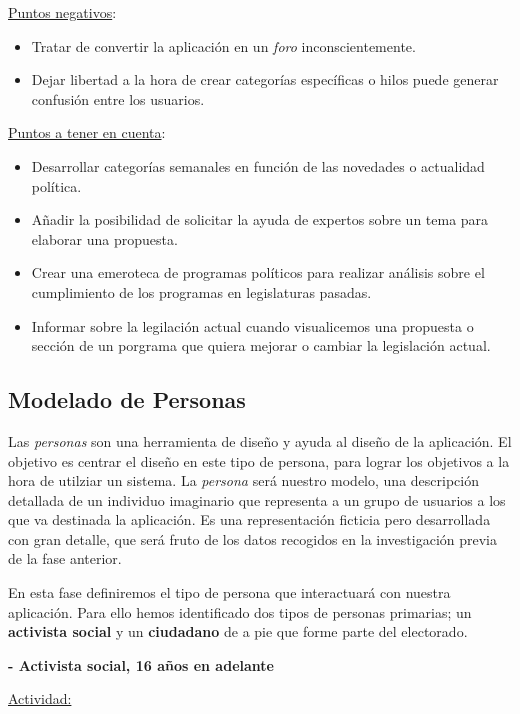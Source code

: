 \underline{Puntos negativos}:

\begin{itemize}
  \item Tratar de convertir la aplicación en un \textit{foro} inconscientemente.
  \item Dejar libertad a la hora de crear categorías específicas o hilos puede generar confusión entre los usuarios. 
\end{itemize}

\underline{Puntos a tener en cuenta}:

\begin{itemize}
  \item Desarrollar categorías semanales en función de las novedades o actualidad política.
  \item Añadir la posibilidad de solicitar la ayuda de expertos sobre un tema para elaborar una propuesta.
  \item Crear una emeroteca de programas políticos para realizar análisis sobre el cumplimiento de los programas en legislaturas pasadas.
  \item Informar sobre la legilación actual cuando visualicemos una propuesta o sección de un porgrama que quiera mejorar o cambiar la legislación actual.
\end{itemize}

\subsection{Modelado de Personas}

Las \textit{personas} son una herramienta de diseño y ayuda al diseño de la aplicación. El objetivo es centrar el diseño en este tipo de persona, para lograr los objetivos a la hora de utilziar un sistema. La \textit{persona} será nuestro modelo, una descripción detallada de un individuo imaginario que representa a un grupo de usuarios a los que va destinada la aplicación. Es una representación ficticia pero desarrollada con gran detalle, que será fruto de los datos recogidos en la investigación previa de la fase anterior.

En esta fase definiremos el tipo de persona que interactuará con nuestra aplicación. Para ello hemos identificado dos tipos de personas primarias; un \textbf{activista social} y un \textbf{ciudadano} de a pie que forme parte del electorado.

\textbf{- Activista social, 16 años en adelante}

\underline{Actividad:}

